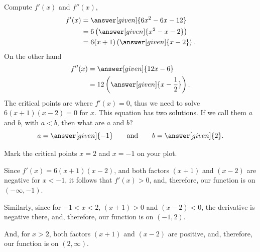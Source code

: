 \documentclass[wordchoicegiven]{ximera}
\begin{document}
\begin{example}
Compute $f'(x)$ and $f''(x)$,
\begin{align*}
  f'(x) &= \answer[given]{6x^2 -6x -12}\\
  &=6\left(\answer[given]{x^2-x-2}\right)\\
  &=6(x+1)\left(\answer[given]{x-2}\right).
\end{align*}
On the other hand
\begin{align*}
  f''(x) &= \answer[given]{12x-6}\\
  &=12\left(\answer[given]{x-\frac{1}{2}}\right).
\end{align*}
The critical points are where $f'(x) = 0$, thus we need to solve
$6(x+1)(x-2) = 0$ for $x$.  This equation has two solutions.  If we
call them $a$ and $b$, with $a<b$, then what are $a$ and $b$?
\[
a = \answer[given]{-1}\qquad\text{and}\qquad b = \answer[given]{2}.
\]

Mark the critical points $x=2$ and $x=-1$ on your plot. %
\begin{image}
\end{image}
Since $f'(x)=6(x+1)(x-2)$, and both factors $(x+1)$ and $(x-2)$ are
negative for $x<-1$, it follows that $f'(x)>0$, and, therefore, our
function is  on $(-\infty,-1)$.


Similarly, since for $-1<x<2$, $(x+1)>0$ and $(x-2)<0$, the
derivative is negative there, and, therefore, our function is
 on
$(-1,2)$.



And, for $x>2$, both factors $(x+1)$ and $(x-2)$ are positive, and,
therefore, our function is  on $(2,\infty)$.
  

\end{example}
\end{document}
